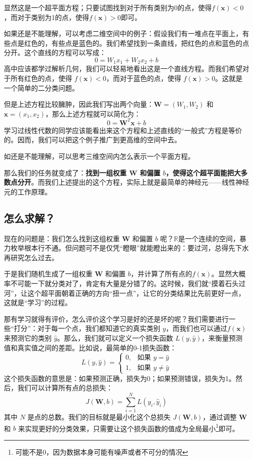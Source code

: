 显然这是一个超平面方程；只要试图找到对于所有类别为0的点，使得$ f(\mathbf{x}) < 0$，而对于类别为1的点，使得$f(\mathbf{x}) > 0$即可。
\begin{tip}
    如果还是不能理解，可以考虑二维空间中的例子：假设我们有一堆点在平面上，有些点是红色的，有些点是蓝色的。我们希望找到一条直线，把红色的点和蓝色的点分开。这个直线的方程可以写成：
    \[ 0 = W_1 x_1 + W_2 x_2 + b \]
    高中应该都学过解析几何，我们可以轻易地看出这是一个直线方程。而我们希望对于所有红色的点，使得 $f(\mathbf{x}) < 0$，而对于蓝色的点，使得 $f(\mathbf{x}) > 0$。这就是一个简单的二分类问题。

    但是上述方程比较臃肿，因此我们写出两个向量：$\mathbf{W} = (W_1, W_2)$ 和 $\mathbf{x} = (x_1, x_2)$，那么上述方程就可以简化为：
    \[ 0 = \mathbf{W}^T \mathbf{x} + b \]
    学习过线性代数的同学应该能看出来这个方程和上述直线的“一般式”方程是等价的。因而，我们可以把这个例子推广到更高维的空间中去。

    如还是不能理解，可以思考三维空间内怎么表示一个平面方程。
\end{tip}

那么我们的任务就变成了：\textbf{找到一组权重 $\mathbf{W}$ 和偏置 $b$，使得这个超平面能把大多数点分开}。而我们上述提出的这个方程，实际上就是最简单的神经元——线性神经元的工作原理。

\subsection{怎么求解？}

现在的问题是：我们怎么找到这组权重 $\mathbf{W}$ 和偏置 $b$ 呢？$\mathbb{R}$是一个连续的空间，暴力枚举根本行不通。但问题可不是仅凭“瞪眼”就能瞪出来的：要过河，总得先下水再研究怎么过去。

于是我们随机生成了一组权重 $\mathbf{W}$ 和偏置 $b$，并计算了所有点的$f(\mathbf{x})$。显然大概率不可能一下就分类对了，肯定有大量是分错了的。这时候，我们就“摸着石头过河”，让这个超平面朝着正确的方向“扭一点”，让它的分类结果比先前更好一点，这就是“学习”的过程。

那有学习就得有评价，怎么评价这个学习是好的还是坏的呢？我们需要进行一些“打分”：对于每一个点，我们都知道它的真实类别 $y$，而我们也可以通过$f(\mathbf{x})$来预测它的类别 $\hat{y}$。那么，我们就可以定义一个损失函数 $L(y, \hat{y})$，来衡量预测值和真实值之间的差距。比如说，最简单的0-1损失函数：
\[ L(y, \hat{y}) = \begin{cases}
0, & \text{如果 } y = \hat{y} \\
1, & \text{如果 } y \neq \hat{y}
\end{cases} \]
这个损失函数的意思是：如果预测正确，损失为0；如果预测错误，损失为1。然后，我们可以计算所有点的总损失：
\[ J(\mathbf{W}, b) = \sum_{i=1}^{N} L(y_i, \hat{y}_i) \]
其中 $N$ 是点的总数。我们的目标就是最小化这个总损失 $J(\mathbf{W}, b)$，通过调整 $\mathbf{W}$ 和 $b$ 来实现更好的分类效果，只需要让这个损失函数的值成为全局最小\footnote{可能不是0，因为数据本身可能有噪声或者不可分的情况}即可。

